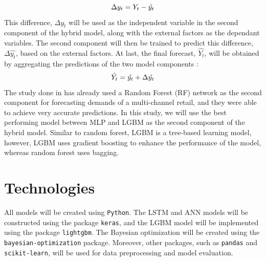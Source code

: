 \[\Delta y_t = Y_t - \hat{y_t} \vspace{-2mm}\]
This difference, \(\Delta y_t\) will be used as the independent variable in the second component of the hybrid model, along with the external factors as the dependant variables. The second component will then be trained to predict this difference, \(\Delta \hat{y_t}\), based on the external factors. At last, the final forecast, \(\hat{Y_t}\), will be obtained by aggregating the predictions of the two model components \cite{c8}:
\vspace{-5mm}
\[\hat{Y_t} = \hat{y_t} + \Delta \hat{y_t} \vspace{-5mm}\]
The study done in \cite{c8} has already used a Random Forest (RF) network as the second component for forecasting demands of a multi-channel retail, and they were able to achieve very accurate predictions.
In this study, we will use the best performing model between MLP and LGBM as the second component of the hybrid model. 
Similar to random forest, LGBM is a tree-based learning model, however, LGBM uses gradient boosting to enhance the performance of the model, whereas random forest uses bagging.

\section{Technologies}
All models will be created using \texttt{Python}. 
The LSTM and ANN models will be constructed using the package \texttt{keras}, and the LGBM model will be implemented using the package \texttt{lightgbm}. 
The Bayesian optimization will be created using the \texttt{bayesian-optimization} package.
Moreover, other packages, such as \texttt{pandas} and \texttt{scikit-learn}, will be used for data preprocessing and model evaluation.